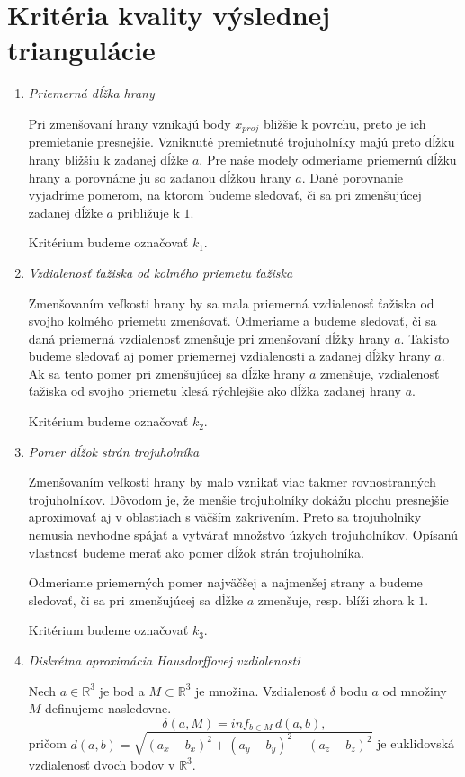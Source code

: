 \section{Kritéria kvality výslednej triangulácie}
\begin{enumerate}
\item{
    \textit{Priemerná dĺžka hrany}

    Pri zmenšovaní hrany vznikajú body $x_{proj}$ bližšie k povrchu, preto je ich premietanie
    presnejšie. Vzniknuté premietnuté trojuholníky majú preto dĺžku hrany bližšiu k zadanej dĺžke 
    $a$. Pre naše modely odmeriame priemernú dĺžku hrany a porovnáme ju so zadanou dĺžkou hrany $a$. 
    Dané porovnanie vyjadríme 
    pomerom, na ktorom budeme sledovať, či sa pri zmenšujúcej zadanej dĺžke $a$ približuje k $1$.

    Kritérium budeme označovať $k_1$.
}
\item{
    \textit{Vzdialenosť ťažiska od kolmého priemetu ťažiska}

    Zmenšovaním veľkosti hrany by sa mala priemerná vzdialenosť ťažiska od svojho kolmého 
    priemetu zmenšovať. Odmeriame a budeme sledovať, či sa daná priemerná vzdialenosť
    zmenšuje pri zmenšovaní dĺžky hrany $a$. Takisto budeme sledovať aj pomer priemernej 
    vzdialenosti a zadanej dĺžky hrany $a$. Ak sa tento pomer pri zmenšujúcej sa dĺžke hrany 
    $a$ zmenšuje, vzdialenosť 
    ťažiska od svojho priemetu klesá rýchlejšie ako dĺžka zadanej hrany $a$.

    Kritérium budeme označovať $k_2$.
}
\item{
    \textit{Pomer dĺžok strán trojuholníka}

    Zmenšovaním veľkosti hrany by malo vznikať viac takmer rovnostranných trojuholníkov.
    Dôvodom je, že menšie trojuholníky dokážu plochu presnejšie aproximovať aj v oblastiach 
    s väčším zakrivením. Preto sa trojuholníky nemusia nevhodne spájať a vytvárať množstvo 
    úzkych trojuholníkov. Opísanú vlastnosť budeme merať ako pomer dĺžok strán trojuholníka. 

    Odmeriame priemerných pomer najväčšej a najmenšej strany a budeme sledovať, či sa pri 
    zmenšujúcej sa dĺžke $a$ zmenšuje, resp. blíži zhora k $1$.

    Kritérium budeme označovať $k_3$.
}
\item{
    \textit{Diskrétna aproximácia Hausdorffovej vzdialenosti}

    \begin{definition}
        Nech $a \in \mathbb{R}^3$ je bod a $M \subset \mathbb{R}^3$ je množina.
        Vzdialenosť $\delta$ bodu $a$ od množiny $M$ definujeme nasledovne.
        \begin{equation}
            \delta(a, M) = inf_{b \in M} \, d(a, b),
        \end{equation}
        pričom $d(a, b) = \sqrt{(a_x-b_x)^2 + (a_y-b_y)^2 + (a_z-b_z)^2}$ je euklidovská 
        vzdialenosť dvoch bodov v $\mathbb{R}^3$.
    \end{definition}

}
\end{enumerate}
